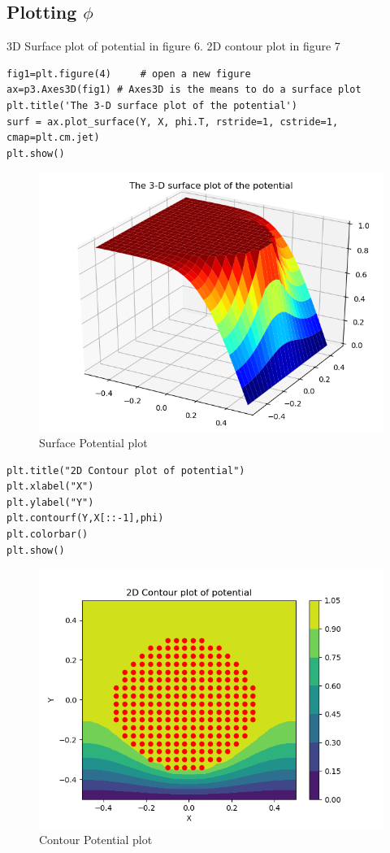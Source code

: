\documentclass{article}
\begin{document}
\subsection*{Plotting $\phi$}
3D Surface plot of potential in figure 6. 2D contour plot in figure 7
\begin{lstlisting}
fig1=plt.figure(4)     # open a new figure
ax=p3.Axes3D(fig1) # Axes3D is the means to do a surface plot
plt.title('The 3-D surface plot of the potential')
surf = ax.plot_surface(Y, X, phi.T, rstride=1, cstride=1, cmap=plt.cm.jet)
plt.show()
\end{lstlisting}
\begin{figure}[h!]
\centering
\includegraphics[scale=0.5]{Figure_8_5.png}
\caption{Surface Potential plot}
\label{Surface Potential plot}
\end{figure}
\begin{lstlisting}
plt.title("2D Contour plot of potential")
plt.xlabel("X")
plt.ylabel("Y")
plt.contourf(Y,X[::-1],phi)
plt.colorbar()
plt.show()
\end{lstlisting}




\begin{figure}[h!]
\centering
\includegraphics[scale=0.5]{Figure_7_5.png}
\caption{Contour Potential plot}
\label{Contour Potential plot}
\end{figure}
\end{document}
